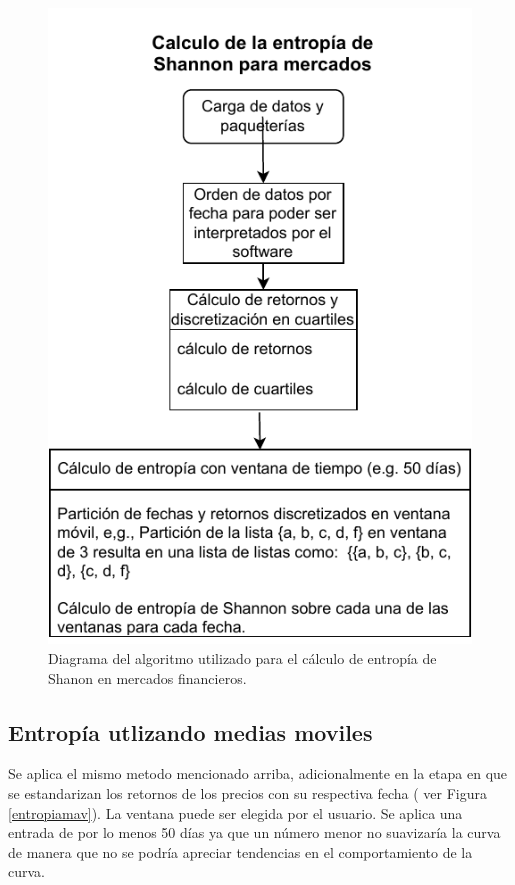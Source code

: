 \begin{figure}
	\includegraphics[width=0.7\linewidth]{figures/diagrama_entropia1}
	\caption{Diagrama del algoritmo utilizado para el c\'alculo de entrop\'ia de Shanon en mercados financieros.}
	\label{diagramaentropia1}
\end{figure}

\subsection{Entropía utlizando medias moviles}

Se aplica el mismo metodo mencionado arriba, adicionalmente en la etapa en que se estandarizan los retornos de los precios con su respectiva fecha ( ver Figura \ref{entropiamav}). La ventana puede ser elegida por el usuario. Se aplica una entrada de por lo menos 50 días ya que un número menor no suavizaría la curva de manera que no se podría apreciar tendencias en el comportamiento de la curva.





